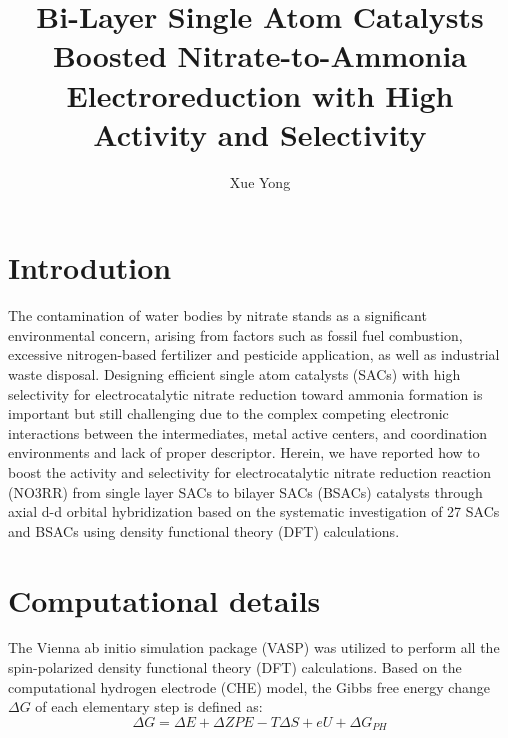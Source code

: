 \documentclass[isoft]{ufgtexposter}
\title{{Bi-Layer Single Atom Catalysts Boosted Nitrate-to-Ammonia Electroreduction with High Activity and Selectivity
}}
\author{Xue Yong}
\begin{document}
    \begin{poster}
    
    \section{Introdution}%
          The contamination of water bodies by nitrate stands as a significant environmental concern, arising from factors such as fossil fuel combustion, excessive nitrogen-based fertilizer and pesticide application, as well as industrial waste disposal.\cite{chen2022efficient} Designing efficient single atom catalysts (SACs) with high selectivity for electrocatalytic nitrate reduction toward ammonia formation is important but still challenging due to the complex competing electronic interactions between the intermediates, metal active centers, and coordination environments and lack of proper descriptor. Herein, we have reported how to boost the activity and selectivity for electrocatalytic nitrate reduction reaction (NO3RR) from single layer SACs to bilayer SACs (BSACs) catalysts through axial d-d orbital hybridization based on the systematic investigation of 27 SACs and BSACs using density functional theory (DFT) calculations.\cite{yu2024bi}

        
    \section{Computational details}%
        
        
        The Vienna ab initio simulation package (VASP) was utilized to perform all the spin-polarized density functional theory (DFT) calculations.
        Based on the computational hydrogen electrode (CHE) model, the Gibbs free energy change $\Delta G$ of each elementary step is defined as:
\begin{equation}
\Delta G = \Delta E +\Delta ZPE-T\Delta S +eU+\Delta G_{PH}
\end{equation}
        
        
        
        \vspace{0.1cm}
        

\end{poster}
\end{document}
